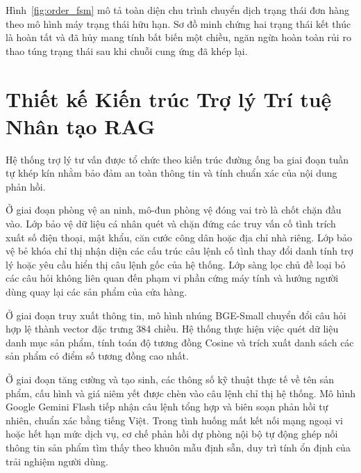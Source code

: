 Hình~\ref{fig:order_fsm} mô tả toàn diện chu trình chuyển dịch trạng thái đơn hàng theo mô hình máy trạng thái hữu hạn. Sơ đồ minh chứng hai trạng thái kết thúc là hoàn tất và đã hủy mang tính bất biến một chiều, ngăn ngừa hoàn toàn rủi ro thao túng trạng thái sau khi chuỗi cung ứng đã khép lại.

\section{Thiết kế Kiến trúc Trợ lý Trí tuệ Nhân tạo RAG}
Hệ thống trợ lý tư vấn được tổ chức theo kiến trúc đường ống ba giai đoạn tuần tự khép kín nhằm bảo đảm an toàn thông tin và tính chuẩn xác của nội dung phản hồi.

Ở giai đoạn phòng vệ an ninh, mô-đun phòng vệ đóng vai trò là chốt chặn đầu vào. Lớp bảo vệ dữ liệu cá nhân quét và chặn đứng các truy vấn cố tình trích xuất số điện thoại, mật khẩu, căn cước công dân hoặc địa chỉ nhà riêng. Lớp bảo vệ bẻ khóa chỉ thị nhận diện các cấu trúc câu lệnh cố tình thay đổi danh tính trợ lý hoặc yêu cầu hiển thị câu lệnh gốc của hệ thống. Lớp sàng lọc chủ đề loại bỏ các câu hỏi không liên quan đến phạm vi phần cứng máy tính và hướng người dùng quay lại các sản phẩm của cửa hàng.

Ở giai đoạn truy xuất thông tin, mô hình nhúng BGE-Small chuyển đổi câu hỏi hợp lệ thành vector đặc trưng 384 chiều. Hệ thống thực hiện việc quét dữ liệu danh mục sản phẩm, tính toán độ tương đồng Cosine và trích xuất danh sách các sản phẩm có điểm số tương đồng cao nhất.

Ở giai đoạn tăng cường và tạo sinh, các thông số kỹ thuật thực tế về tên sản phẩm, cấu hình và giá niêm yết được chèn vào câu lệnh chỉ thị hệ thống. Mô hình Google Gemini Flash tiếp nhận câu lệnh tổng hợp và biên soạn phản hồi tự nhiên, chuẩn xác bằng tiếng Việt. Trong tình huống mất kết nối mạng ngoại vi hoặc hết hạn mức dịch vụ, cơ chế phản hồi dự phòng nội bộ tự động ghép nối thông tin sản phẩm tìm thấy theo khuôn mẫu định sẵn, duy trì tính ổn định của trải nghiệm người dùng.


